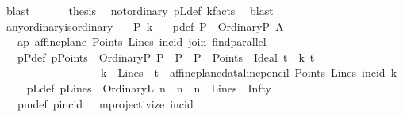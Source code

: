 \begin{isabellebody}
\ blast\isanewline
\ \ \isamarkupfalse%
\isanewline
\ \ \isamarkupfalse%
\ {\isacharquery}{\kern0pt}thesis\ \isamarkupfalse%
\ not{\isacharunderscore}{\kern0pt}ordinary\ pLdef\ k{\isacharunderscore}{\kern0pt}facts\ \isamarkupfalse%
\ blast\ \isanewline
{}\isamarkupfalse%
%
\endisatagproof
{\isafoldproof}%
%
\isadelimproof
\isanewline
%
\endisadelimproof
\isanewline
\ \isanewline
{}\isamarkupfalse%
\ any{\isacharunderscore}{\kern0pt}ordinary{\isacharunderscore}{\kern0pt}is{\isacharunderscore}{\kern0pt}ordinary{\isacharcolon}{\kern0pt}\isanewline
\ \ \ P\ k\isanewline
\ \ \ p{\isacharunderscore}{\kern0pt}def{\isacharcolon}{\kern0pt}\ {\isachardoublequoteopen}P\ {\isacharequal}{\kern0pt}\ OrdinaryP\ A{\isachardoublequoteclose}\isanewline
\ \ \ ap{\isacharcolon}{\kern0pt}\ {\isachardoublequoteopen}affine{\isacharunderscore}{\kern0pt}plane\ Points\ Lines\ incid\ join\ find{\isacharunderscore}{\kern0pt}parallel{\isachardoublequoteclose}\isanewline
\ \ \ pPdef{\isacharcolon}{\kern0pt}\ {\isachardoublequoteopen}pPoints\ {\isasymequiv}\ {\isacharbraceleft}{\kern0pt}OrdinaryP\ P\ {\isacharbar}{\kern0pt}\ P\ {\isachardot}{\kern0pt}\ {\isacharparenleft}{\kern0pt}P\ {\isasymin}\ Points{\isacharparenright}{\kern0pt}{\isacharbraceright}{\kern0pt}\ {\isasymunion}\ {\isacharbraceleft}{\kern0pt}Ideal\ t\ {\isacharbar}{\kern0pt}\ k\ t\ {\isachardot}{\kern0pt}\ \isanewline
\ \ \ \ \ \ \ \ \ \ \ \ \ \ \ \ \ \ {\isacharparenleft}{\kern0pt}{\isacharparenleft}{\kern0pt}k\ {\isasymin}\ Lines{\isacharparenright}{\kern0pt}\ {\isasymand}\ {\isacharparenleft}{\kern0pt}t\ {\isacharequal}{\kern0pt}\ affine{\isacharunderscore}{\kern0pt}plane{\isacharunderscore}{\kern0pt}data{\isachardot}{\kern0pt}line{\isacharunderscore}{\kern0pt}pencil\ Points\ Lines\ {\isacharparenleft}{\kern0pt}incid{\isacharparenright}{\kern0pt}\ k{\isacharparenright}{\kern0pt}\ {\isacharparenright}{\kern0pt}{\isacharbraceright}{\kern0pt}{\isachardoublequoteclose}\isanewline
\ \ \ pLdef{\isacharcolon}{\kern0pt}\ {\isachardoublequoteopen}pLines\ {\isasymequiv}\ {\isacharbraceleft}{\kern0pt}OrdinaryL\ n\ {\isacharbar}{\kern0pt}\ n\ {\isachardot}{\kern0pt}\ {\isacharparenleft}{\kern0pt}n\ {\isasymin}\ Lines{\isacharparenright}{\kern0pt}{\isacharbraceright}{\kern0pt}\ {\isasymunion}\ {\isacharbraceleft}{\kern0pt}Infty{\isacharbraceright}{\kern0pt}{\isachardoublequoteclose}\isanewline
\ \ \ pm{\isacharunderscore}{\kern0pt}def{\isacharcolon}{\kern0pt}\ {\isachardoublequoteopen}pincid\ {\isasymequiv}\ \ mprojectivize\ {\isacharparenleft}{\kern0pt}incid{\isacharparenright}{\kern0pt}{\isachardoublequoteclose}\isanewline

\end{isabellebody}
